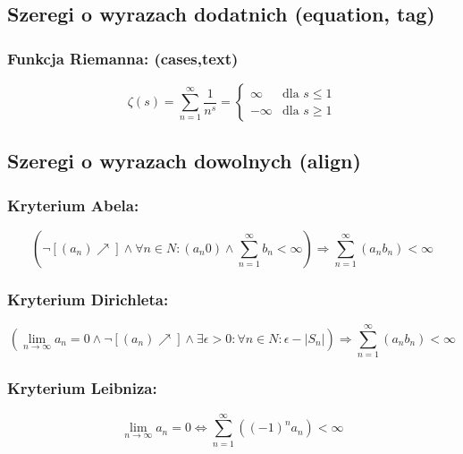 \documentclass[12pt]{article}
\begin{document}
\subsection{Szeregi o wyrazach dodatnich (equation, tag)}

\subsubsection{Funkcja Riemanna: (cases,text)}

\begin{equation}
	\tag{0}
	\zeta (s) = \sum_{n=1}^\infty \frac{1}{n^s} = 
		\begin{cases}
			\infty & \text{dla } s \leq 1 \\
			-\infty & \text{dla } s \ge 1
		\end{cases}
\end{equation}

\subsection{Szeregi o wyrazach dowolnych (align)}

\subsubsection{Kryterium Abela:}

\begin{equation}
	\left(\lnot [(a_n) \nearrow] \land \forall{n \in N} : (a_n 0) \land \sum_{n=1}^\infty b_n < \infty \right) \Rightarrow \sum_{n=1}^\infty (a_n b_n) < \infty
\end{equation}

\subsubsection{Kryterium Dirichleta:}

\begin{equation}
	\left(\lim_{n \to \infty} a_n = 0 \land \lnot [(a_n) \nearrow] \land \exists{\epsilon > 0} : \forall{n \in N} : \epsilon - |S_n| \right) \Rightarrow \sum_{n=1}^\infty (a_n b_n) < \infty
\end{equation}

\subsubsection{Kryterium Leibniza:}

\begin{equation}
	\lim_{n \to \infty} a_n = 0 \iff \sum_{n=1}^\infty ((-1)^n a_n) < \infty
\end{equation}
\end{document}
